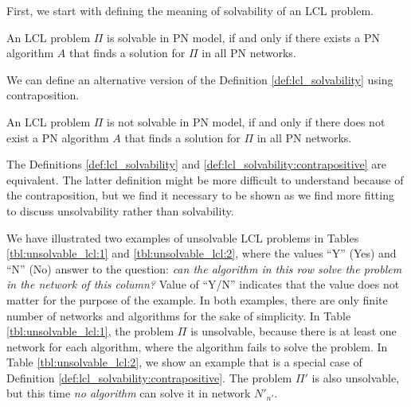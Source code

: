 First, we start with defining the meaning of solvability of an LCL problem.
\begin{definition} \label{def:lcl_solvability}
    An LCL problem $\Pi$ is solvable in PN model, if and only if there exists a PN algorithm $A$ that finds a solution for $\Pi$ in all PN networks.
\end{definition}

We can define an alternative version of the Definition \ref{def:lcl_solvability} using contraposition.
\begin{definition} \label{def:lcl_solvability:contrapositive}
An LCL problem $\Pi$ is not solvable in PN model, if and only if there does not exist a PN algorithm $A$ that finds a solution for $\Pi$ in all PN networks.
\end{definition}

The Definitions \ref{def:lcl_solvability} and \ref{def:lcl_solvability:contrapositive} are equivalent. The latter definition might be more difficult to understand because of the contraposition, but we find it necessary to be shown as we find more fitting to discuss unsolvability rather than solvability.


We have illustrated two examples of unsolvable LCL problems in Tables \ref{tbl:unsolvable_lcl:1} and \ref{tbl:unsolvable_lcl:2}, where the values ``Y'' (Yes) and ``N'' (No) answer to the question: \emph{can the algorithm in this row solve the problem in the network of this column?}
Value of ``Y/N'' indicates that the value does not matter for the purpose of the example.
In both examples, there are only finite number of networks and algorithms for the sake of simplicity.
In Table \ref{tbl:unsolvable_lcl:1}, the problem $\Pi$ is unsolvable, because there is at least one network for each algorithm, where the algorithm fails to solve the problem.
In Table \ref{tbl:unsolvable_lcl:2}, we show an example that is a special case of Definition \ref{def:lcl_solvability:contrapositive}.
The problem $\Pi'$ is also unsolvable, but this time \emph{no algorithm} can solve it in network $N'_{n'}$.

